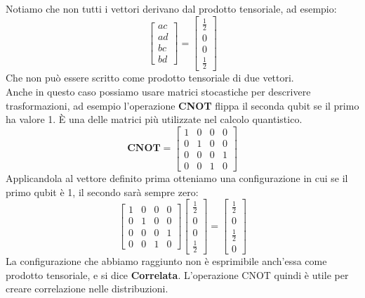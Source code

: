 \documentclass{article}
\begin{document}
    Notiamo che non tutti i vettori derivano dal prodotto tensoriale, ad esempio:
    $$
        \begin{bmatrix}
        ac \\ ad \\ bc \\bd
    \end{bmatrix}
    =\begin{bmatrix}
        \frac{1}{2} \\ 0 \\ 0 \\ \frac{1}{2}
    \end{bmatrix}
    $$
    Che non può essere scritto come prodotto tensoriale di due vettori.
    \medskip
    \\
    Anche in questo caso possiamo usare matrici stocastiche per descrivere trasformazioni, ad esempio l'operazione \textbf{CNOT} flippa il seconda qubit se il primo ha valore 1. È una delle matrici più utilizzate nel calcolo quantistico.
    $$
        \textbf{CNOT} = 
    \begin{bmatrix}
        1 &0 &0 &0 \\ 0 &1 &0 &0\\ 0 & 0& 0&1\\ 0&0&1&0
    \end{bmatrix}
    $$
    Applicandola al vettore definito prima otteniamo una configurazione in cui se il primo qubit è 1, il secondo sarà sempre zero:
    $$
        \begin{bmatrix}
        1 &0 &0 &0 \\ 0 &1 &0 &0\\ 0 & 0& 0&1\\ 0&0&1&0
    \end{bmatrix}
    \begin{bmatrix}
        \frac{1}{2} \\ 0 \\ 0 \\ \frac{1}{2}
    \end{bmatrix}
    =
    \begin{bmatrix}
        \frac{1}{2} \\ 0 \\ \frac{1}{2} \\ 0
    \end{bmatrix}
    $$
    La configurazione che abbiamo raggiunto non è esprimibile anch'essa come prodotto tensoriale, e si dice \textbf{Correlata}. L'operazione CNOT quindi è utile per creare correlazione nelle distribuzioni.
    \medskip
    \\
\end{document}
